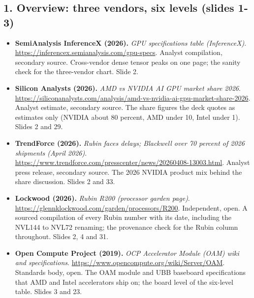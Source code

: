 \documentclass[11pt,letterpaper]{article}
\begin{document}
\subsection*{1. Overview: three vendors, six levels (slides 1-3)}
\begin{itemize}[leftmargin=1.2em,itemsep=3pt]\sloppy
\item \textbf{SemiAnalysis InferenceX (2026).} \textit{GPU specifications table (InferenceX)}. \url{https://inferencex.semianalysis.com/gpu-specs}. Analyst compilation, secondary source. Cross-vendor dense tensor peaks on one page; the sanity check for the three-vendor chart. Slide 2.
\item \textbf{Silicon Analysts (2026).} \textit{AMD vs NVIDIA AI GPU market share 2026}. \url{https://siliconanalysts.com/analysis/amd-vs-nvidia-ai-gpu-market-share-2026}. Analyst estimate, secondary source. The share figures the deck quotes as estimates only (NVIDIA about 80 percent, AMD under 10, Intel under 1). Slides 2 and 29.
\item \textbf{TrendForce (2026).} \textit{Rubin faces delays; Blackwell over 70 percent of 2026 shipments (April 2026)}. \url{https://www.trendforce.com/presscenter/news/20260408-13003.html}. Analyst press release, secondary source. The 2026 NVIDIA product mix behind the share discussion. Slides 2 and 33.
\item \textbf{Lockwood (2026).} \textit{Rubin R200 (processor garden page)}. \url{https://glennklockwood.com/garden/processors/R200}. Independent, open. A sourced compilation of every Rubin number with its date, including the NVL144 to NVL72 renaming; the provenance check for the Rubin column throughout. Slides 2, 4 and 31.
\item \textbf{Open Compute Project (2019).} \textit{OCP Accelerator Module (OAM) wiki and specifications}. \url{https://www.opencompute.org/wiki/Server/OAM}. Standards body, open. The OAM module and UBB baseboard specifications that AMD and Intel accelerators ship on; the board level of the six-level table. Slides 3 and 23.
\end{itemize}
\end{document}
